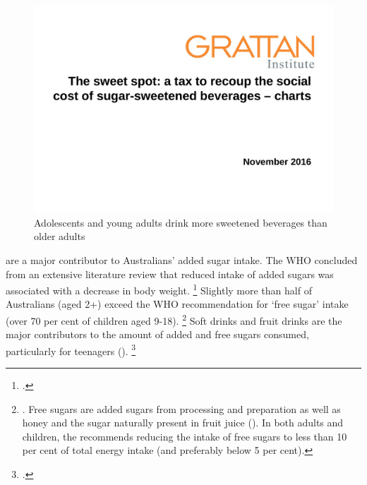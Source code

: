 \documentclass[embargoed]{grattan}
\begin{document}
\begin{figure}
\caption{Adolescents and young adults drink more sweetened beverages than older adults}\label{fig:adolescents-drink-more-sweet-beverages-than-adults}

\includegraphics[page=9]{atlas/ObesityCharts}


\end{figure}


\SSBs{} are a major contributor to Australians' added sugar intake.
The WHO concluded from an extensive literature review that reduced intake of added sugars was associated with a decrease in body weight.%
\footcite{Organisation2015Sugarsintakeadults} Slightly more than half of Australians (aged 2+) exceed the WHO recommendation for `free sugar' intake (over 70 per cent of children aged 9-18).%
\footnote{\textcite{Lei2016Dietaryintakefood}.
Free sugars are added sugars from processing and preparation as well as honey and the sugar naturally present in fruit juice (\textcite[][Table~3.1]{ABS20164364055011AustralianHealth}).
In both adults and children, the \textcite{Organisation2015Sugarsintakeadults} recommends reducing the intake of free sugars to less than 10 per cent of total energy intake (and preferably below 5 per cent).} Soft drinks and fruit drinks are the major contributors to the amount of added and free sugars consumed, particularly for teenagers ().%
\footcite{ABS20164364055011AustralianHealth}
\end{document}
